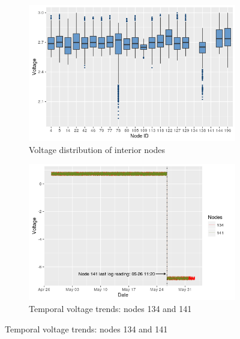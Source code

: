 \documentclass[11pt]{article}
\begin{document}
\begin{figure}[here]
  \centering
  \begin{subfigure}{.5\textwidth}
    \centering
      \includegraphics[width=0.9\linewidth]{../figures/box_volt_node.png}
    \caption{Voltage distribution of interior nodes}
    \label{fig:boxVoltNode}
  \end{subfigure}%
  \begin{subfigure}{.5\textwidth}
    \centering
      \includegraphics[width=0.9\linewidth]{../figures/voltDate_2.png}
    \caption{Temporal voltage trends: nodes 134 and 141}
    \label{fig:voltDate2}
  \end{subfigure}


\end{figure}
\end{document}
